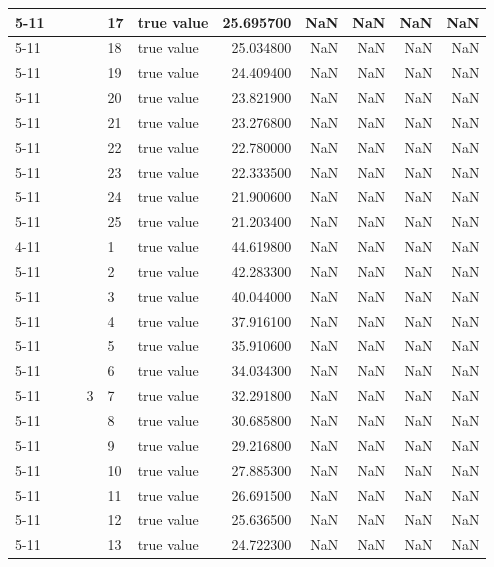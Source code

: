 \begin{tabular}{llllllrrrrr}
\cline{5-11}
 &  &  &  & 17 & true value & 25.695700 & NaN & NaN & NaN & NaN \\
\cline{5-11}
 &  &  &  & 18 & true value & 25.034800 & NaN & NaN & NaN & NaN \\
\cline{5-11}
 &  &  &  & 19 & true value & 24.409400 & NaN & NaN & NaN & NaN \\
\cline{5-11}
 &  &  &  & 20 & true value & 23.821900 & NaN & NaN & NaN & NaN \\
\cline{5-11}
 &  &  &  & 21 & true value & 23.276800 & NaN & NaN & NaN & NaN \\
\cline{5-11}
 &  &  &  & 22 & true value & 22.780000 & NaN & NaN & NaN & NaN \\
\cline{5-11}
 &  &  &  & 23 & true value & 22.333500 & NaN & NaN & NaN & NaN \\
\cline{5-11}
 &  &  &  & 24 & true value & 21.900600 & NaN & NaN & NaN & NaN \\
\cline{5-11}
 &  &  &  & 25 & true value & 21.203400 & NaN & NaN & NaN & NaN \\
\cline{4-11} \cline{5-11}
 &  &  & \multirow[t]{25}{*}{3} & 1 & true value & 44.619800 & NaN & NaN & NaN & NaN \\
\cline{5-11}
 &  &  &  & 2 & true value & 42.283300 & NaN & NaN & NaN & NaN \\
\cline{5-11}
 &  &  &  & 3 & true value & 40.044000 & NaN & NaN & NaN & NaN \\
\cline{5-11}
 &  &  &  & 4 & true value & 37.916100 & NaN & NaN & NaN & NaN \\
\cline{5-11}
 &  &  &  & 5 & true value & 35.910600 & NaN & NaN & NaN & NaN \\
\cline{5-11}
 &  &  &  & 6 & true value & 34.034300 & NaN & NaN & NaN & NaN \\
\cline{5-11}
 &  &  &  & 7 & true value & 32.291800 & NaN & NaN & NaN & NaN \\
\cline{5-11}
 &  &  &  & 8 & true value & 30.685800 & NaN & NaN & NaN & NaN \\
\cline{5-11}
 &  &  &  & 9 & true value & 29.216800 & NaN & NaN & NaN & NaN \\
\cline{5-11}
 &  &  &  & 10 & true value & 27.885300 & NaN & NaN & NaN & NaN \\
\cline{5-11}
 &  &  &  & 11 & true value & 26.691500 & NaN & NaN & NaN & NaN \\
\cline{5-11}
 &  &  &  & 12 & true value & 25.636500 & NaN & NaN & NaN & NaN \\
\cline{5-11}
 &  &  &  & 13 & true value & 24.722300 & NaN & NaN & NaN & NaN \\

\end{tabular}
